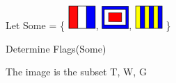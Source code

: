 \documentclass{ximera}
\begin{document}
\begin{exercise}
Let  Some = \{ {\includegraphics[width=40px,height=34px]{pics/flags/T.png}}, {\includegraphics[width=39px,height=33px]{pics/flags/W.png}}, {\includegraphics[width=40px,height=34px]{pics/flags/G.png}}  \}

Determine Flags(Some)

  \begin{selectAll}
  \end{selectAll}
  \begin{feedback}
The image is the subset T, W, G 
  \end{feedback}
\end{exercise}
\end{document}
